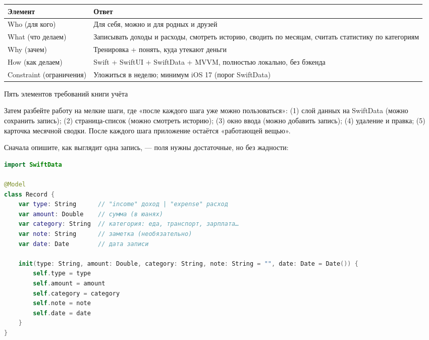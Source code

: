


\begin{center}
\begin{tabularx}{\linewidth}{|X|X|}
\hline
\textbf{Элемент} & \textbf{Ответ} \tabularnewline
\hline
Who (для кого) & Для себя, можно и для родных и друзей \tabularnewline
What (что делаем) & Записывать доходы и расходы, смотреть историю, сводить по месяцам, считать статистику по категориям \tabularnewline
Why (зачем) & Тренировка + понять, куда утекают деньги \tabularnewline
How (как делаем) & Swift + SwiftUI + SwiftData + MVVM, полностью локально, без бэкенда \tabularnewline
Constraint (ограничения) & Уложиться в неделю; минимум iOS 17 (порог SwiftData) \tabularnewline
\hline
\end{tabularx}
\end{center}

\begin{center}\small\color{gray}Пять элементов требований книги учёта\end{center}

Затем разбейте работу на мелкие шаги, где «после каждого шага уже можно пользоваться»: (1) слой данных на SwiftData (можно сохранить запись); (2) страница-список (можно смотреть историю); (3) окно ввода (можно добавить запись); (4) удаление и правка; (5) карточка месячной сводки. После каждого шага приложение остаётся «работающей вещью».


Сначала опишите, как выглядит одна запись, — поля нужны достаточные, но без жадности:

\begin{lstlisting}[language=Swift]
import SwiftData

@Model
class Record {
    var type: String      // "income" доход | "expense" расход
    var amount: Double    // сумма (в юанях)
    var category: String  // категория: еда, транспорт, зарплата…
    var note: String      // заметка (необязательно)
    var date: Date        // дата записи

    init(type: String, amount: Double, category: String, note: String = "", date: Date = Date()) {
        self.type = type
        self.amount = amount
        self.category = category
        self.note = note
        self.date = date
    }
}
\end{lstlisting}

